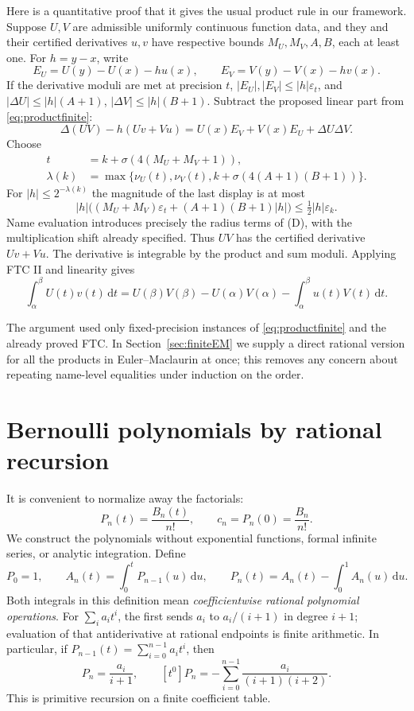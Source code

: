 \documentclass[11pt]{article}
\theoremstyle{definition}
\newcommand{\eps}{\varepsilon}
\newcommand{\abs}[1]{\left|#1\right|}
\newcommand{\dd}{\,\mathrm{d}}
\begin{document}
Here is a quantitative proof that it gives the usual product rule in
our framework.  Suppose \(U,V\) are admissible uniformly continuous
function data, and they and their certified derivatives
\(u,v\) have respective bounds \(M_U,M_V,A,B\), each at least one.
For \(h=y-x\), write
\[
 E_U=U(y)-U(x)-hu(x),\qquad
 E_V=V(y)-V(x)-hv(x).
\]
If the derivative moduli are met at precision \(t\),
\(\abs{E_U},\abs{E_V}\le\abs h\eps_t\), and
\(\abs{\Delta U}\le\abs h(A+1)\),
\(\abs{\Delta V}\le\abs h(B+1)\).  Subtract the proposed linear
part from \eqref{eq:productfinite}:
\[
 \Delta(UV)-h(Uv+Vu)=U(x)E_V+V(x)E_U+\Delta U\Delta V.
\]
Choose
\begin{align*}
 t&=k+\sigma(4(M_U+M_V+1)),\\
 \lambda(k)&=\max\{\nu_U(t),\nu_V(t),
                   k+\sigma(4(A+1)(B+1))\}.
\end{align*}
For \(\abs h\le2^{-\lambda(k)}\) the magnitude of the last display
is at most
\[
 \abs h\bigl((M_U+M_V)\eps_t+(A+1)(B+1)\abs h\bigr)
 \le\tfrac12\abs h\eps_k.
\]
Name evaluation introduces precisely the radius terms of (D), with
the multiplication shift already specified.  Thus \(UV\) has the
certified derivative \(Uv+Vu\).  The derivative is integrable by the
product and sum moduli.  Applying FTC II and linearity gives
\begin{equation}
\int_\alpha^\beta U(t)v(t)\dd t
 =U(\beta)V(\beta)-U(\alpha)V(\alpha)
       -\int_\alpha^\beta u(t)V(t)\dd t.\label{eq:IBP}
\end{equation}

The argument used only fixed-precision instances of
\eqref{eq:productfinite} and the already proved FTC.  In
Section~\ref{sec:finiteEM} we supply a direct rational version for all
the products in Euler--Maclaurin at once; this removes any concern about
repeating name-level equalities under induction on the order.

\section{Bernoulli polynomials by rational recursion}\label{sec:bernoulli}

It is convenient to normalize away the factorials:
\[
 P_n(t)=\frac{B_n(t)}{n!},\qquad c_n=P_n(0)=\frac{B_n}{n!}.
\]
We construct the polynomials without exponential functions, formal
infinite series, or analytic integration.  Define
\begin{equation}
 P_0=1,\qquad
 A_n(t)=\int_0^t P_{n-1}(u)\dd u,\qquad
 P_n(t)=A_n(t)-\int_0^1 A_n(u)\dd u.\label{eq:Pdef}
\end{equation}
Both integrals in this definition mean \emph{coefficientwise rational
polynomial operations}.  For \(\sum_i a_it^i\), the first sends
\(a_i\) to \(a_i/(i+1)\) in degree \(i+1\); evaluation of that
antiderivative at rational endpoints is finite arithmetic.  In
particular, if \(P_{n-1}(t)=\sum_{i=0}^{n-1}a_it^i\), then
\begin{equation}
 [t^{i+1}]P_n=\frac{a_i}{i+1},\qquad
 [t^0]P_n=-\sum_{i=0}^{n-1}\frac{a_i}{(i+1)(i+2)}.\label{eq:Pcoeff}
\end{equation}
This is primitive recursion on a finite coefficient table.
\end{document}
